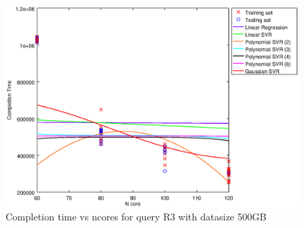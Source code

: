 
\begin {figure}[hbtp]
\centering
\includegraphics[width=\textwidth]{output/R3_500_LINEAR_NCORE/plot_R3_500.eps}
\caption{Completion time vs ncores for query R3 with datasize 500GB}
\label{fig:coreonly_linear_R3_500}
\end {figure}
